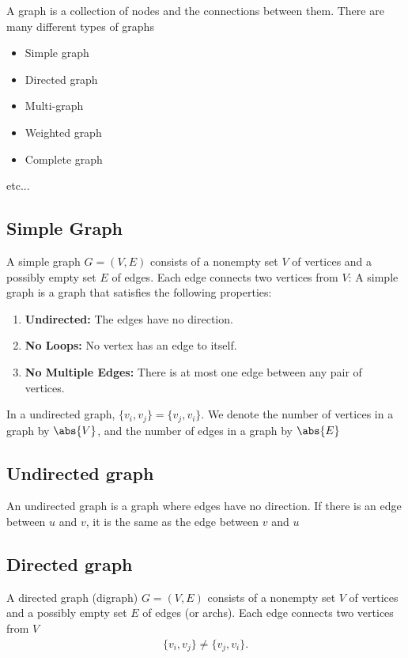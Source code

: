 \documentclass{report}
\begin{document}
\pagebreak 
{}
\bigbreak \noindent 
A graph is a collection of nodes and the connections between them. There are many different types of graphs
\bigbreak \noindent 
\begin{itemize}
    \item Simple graph
    \item Directed graph
    \item Multi-graph
    \item Weighted graph
    \item Complete graph
\end{itemize}
etc...
\bigbreak \noindent 
\subsection{Simple Graph}
\bigbreak \noindent 
A simple graph $G=(V,E)$ consists of a nonempty set $V$ of vertices and a possibly empty set $E$ of edges. Each edge connects two vertices from $V$:
\bigbreak \noindent 
A simple graph is a graph that satisfies the following properties:
\begin{enumerate}
    \item \textbf{Undirected:} The edges have no direction.
    \item \textbf{No Loops:} No vertex has an edge to itself.
    \item \textbf{No Multiple Edges:} There is at most one edge between any pair of vertices.
\end{enumerate}
\bigbreak \noindent 
In a undirected graph, $\{v_{i}, v_{j}\} = \{v_{j}, v_{i}\}$. We denote the number of vertices in a graph by $\abs{V}$, and the number of edges in a graph by $\abs{E}$
\bigbreak \noindent 
\subsection{Undirected graph}
\bigbreak \noindent 
An undirected graph is a graph where edges have no direction. If there is an edge between $u$ and $v$, it is the same as the edge between $v$ and $u$
\bigbreak \noindent 
\subsection{Directed graph}
\bigbreak \noindent 
A directed graph (digraph) $G=(V,E)$ consists of a nonempty set $V$ of vertices and a possibly empty set $E$ of edges (or archs). Each edge connects two vertices from $V$
\begin{align*}
    \{v_{i}, v_{j}\} \ne \{v_{j}, v_{i}\}
.\end{align*}
\end{document}
